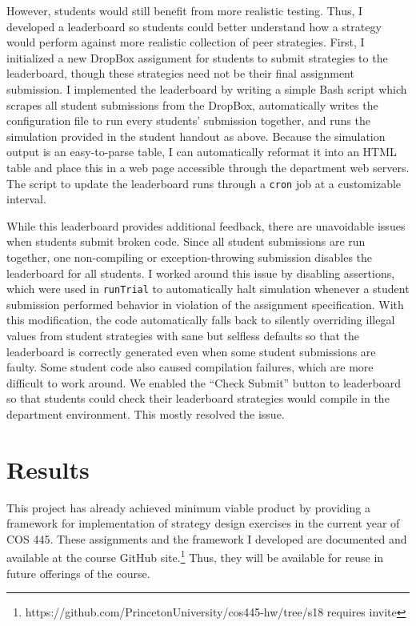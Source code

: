 \documentclass[pageno]{jpaper}
\begin{document}
However, students would still benefit from more realistic testing.
Thus, I developed a leaderboard so students could better understand how a strategy would perform against more realistic collection of peer strategies.
First, I initialized a new DropBox assignment for students to submit strategies to the leaderboard, though these strategies need not be their final assignment submission.
I implemented the leaderboard by writing a simple Bash script which scrapes all student submissions from the DropBox, automatically writes the configuration file to run every students' submission together, and runs the simulation provided in the student handout as above.
Because the simulation output is an easy-to-parse table, I can automatically reformat it into an HTML table and place this in a web page accessible through the department web servers.
The script to update the leaderboard runs through a \texttt{cron} job at a customizable interval.

While this leaderboard provides additional feedback, there are unavoidable issues when students submit broken code.
Since all student submissions are run together, one non-compiling or exception-throwing submission disables the leaderboard for all students.
I worked around this issue by disabling assertions, which were used in \texttt{runTrial} to automatically halt simulation whenever a student submission performed behavior in violation of the assignment specification.
With this modification, the code automatically falls back to silently overriding illegal values from student strategies with sane but selfless defaults so that the leaderboard is correctly generated even when some student submissions are faulty.
Some student code also caused compilation failures, which are more difficult to work around.
We enabled the ``Check Submit'' button to leaderboard so that students could check their leaderboard strategies would compile in the department environment.
This mostly resolved the issue.

\section*{Results}
This project has already achieved minimum viable product by providing a framework for implementation of strategy design exercises in the current year of COS 445.
These assignments and the framework I developed are documented and available at the course GitHub site.\footnote{https://github.com/PrincetonUniversity/cos445-hw/tree/s18 requires invite}
Thus, they will be available for reuse in future offerings of the course.
\end{document}
